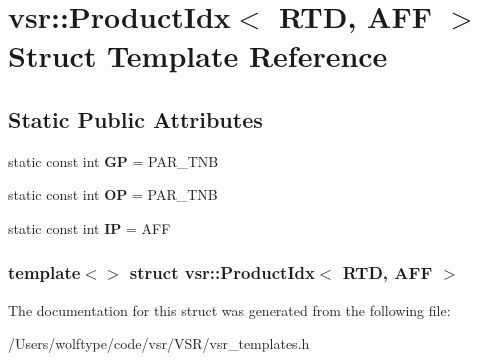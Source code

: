 \hypertarget{structvsr_1_1_product_idx_3_01_r_t_d_00_01_a_f_f_01_4}{\section{vsr\-:\-:Product\-Idx$<$ R\-T\-D, A\-F\-F $>$ Struct Template Reference}
\label{structvsr_1_1_product_idx_3_01_r_t_d_00_01_a_f_f_01_4}
}
\subsection*{Static Public Attributes}
\begin{DoxyCompactItemize}
\item 
\hypertarget{structvsr_1_1_product_idx_3_01_r_t_d_00_01_a_f_f_01_4_a32895dbdecaab792a9884031bf267427}{static const int {\bfseries G\-P} = P\-A\-R\-\_\-\-T\-N\-B}\label{structvsr_1_1_product_idx_3_01_r_t_d_00_01_a_f_f_01_4_a32895dbdecaab792a9884031bf267427}

\item 
\hypertarget{structvsr_1_1_product_idx_3_01_r_t_d_00_01_a_f_f_01_4_ad11990f80c6abd38449ef5088c631256}{static const int {\bfseries O\-P} = P\-A\-R\-\_\-\-T\-N\-B}\label{structvsr_1_1_product_idx_3_01_r_t_d_00_01_a_f_f_01_4_ad11990f80c6abd38449ef5088c631256}

\item 
\hypertarget{structvsr_1_1_product_idx_3_01_r_t_d_00_01_a_f_f_01_4_a62c482a8d22b8ed770c40ffafc133fd6}{static const int {\bfseries I\-P} = A\-F\-F}\label{structvsr_1_1_product_idx_3_01_r_t_d_00_01_a_f_f_01_4_a62c482a8d22b8ed770c40ffafc133fd6}

\end{DoxyCompactItemize}
\subsubsection*{template$<$$>$ struct vsr\-::\-Product\-Idx$<$ R\-T\-D, A\-F\-F $>$}



The documentation for this struct was generated from the following file\-:\begin{DoxyCompactItemize}
\item 
/\-Users/wolftype/code/vsr/\-V\-S\-R/vsr\-\_\-templates.\-h\end{DoxyCompactItemize}
